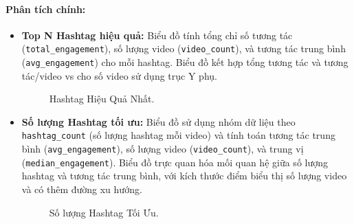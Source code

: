 \paragraph{Phân tích chính:}
    \begin{itemize}
        \item \textbf{Top N Hashtag hiệu quả:} Biểu đồ tính tổng chỉ số tương tác (\texttt{total\_engagement}), số lượng video (\texttt{video\_count}), và tương tác trung bình (\texttt{avg\_engagement}) cho mỗi hashtag. Biểu đồ kết hợp tổng tương tác và tương tác/video vs cho số video sử dụng trục Y phụ.
        \begin{figure}[H] %
            \centering
            \caption{Hashtag Hiệu Quả Nhất.}
        \end{figure}

        \item \textbf{Số lượng Hashtag tối ưu:} Biểu đồ sử dụng nhóm dữ liệu theo \texttt{hashtag\_count} (số lượng hashtag mỗi video) và tính toán tương tác trung bình (\texttt{avg\_engagement}), số lượng video (\texttt{video\_count}), và trung vị (\texttt{median\_engagement}). Biểu đồ trực quan hóa mối quan hệ giữa số lượng hashtag và tương tác trung bình, với kích thước điểm biểu thị số lượng video và có thêm đường xu hướng.
        \begin{figure}[H]
            \centering
            \caption{Số lượng Hashtag Tối Ưu.}
        \end{figure}
        

\end{itemize}
